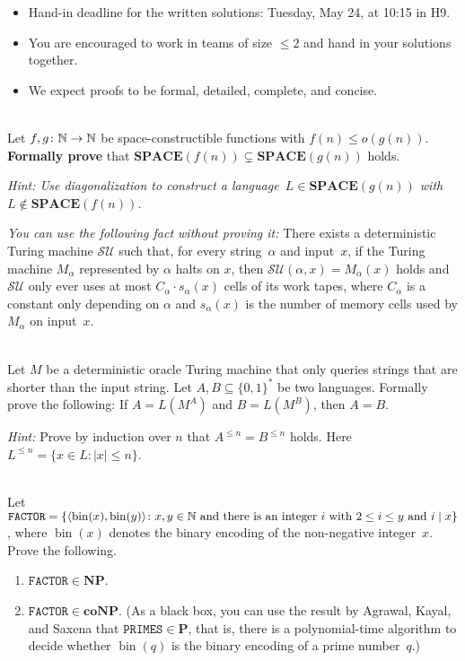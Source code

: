\documentclass[english]{uebung_cs}
\begin{document}
\begin{itemize}
  \item Hand-in deadline for the written solutions: Tuesday, May 24, at 10:15 in H9.
  \item You are encouraged to work in teams of size $\le 2$ and hand in your solutions together.
  \item We expect proofs to be formal, detailed, complete, and concise.
\end{itemize}

\begin{aufgabe}[Diagonalization]\mbox{}\\
    Let $f,g\colon\mathbb{N}\to\mathbb{N}$ be space-constructible functions with $f(n)\le o(g(n))$.
    \textbf{Formally prove} that $\mathbf{SPACE}(f(n))\subsetneq\mathbf{SPACE}(g(n))$ holds.

    \textit{Hint: Use diagonalization to construct a language~$L\in\mathbf{SPACE}(g(n))$ with $L\not\in\mathbf{SPACE}(f(n))$.}

    \textit{You can use the following fact without proving it:}
    There exists a deterministic Turing machine $\mathcal{SU}$ such that, for every string~$\alpha$ and input~$x$, if the Turing machine $M_\alpha$ represented by $\alpha$ halts on $x$, then
      $\mathcal{SU}(\alpha,x)=M_\alpha(x)$ holds and
      $\mathcal{SU}$ only ever uses at most $C_\alpha\cdot s_\alpha(x)$ cells of its work tapes, where $C_\alpha$ is a constant only depending on $\alpha$ and $s_\alpha(x)$ is the number of memory cells used by $M_\alpha$ on input~$x$.
\end{aufgabe}

\begin{aufgabe}[Oracles]\mbox{}\\
  Let $M$ be a deterministic oracle Turing machine that only queries strings 
  that are shorter than the input string.
  Let $A,B\subseteq\{0,1\}^\ast$ be two languages.
  Formally prove the following: If $A = L(M^A)$ and $B = L(M^B)$, then $A = B$.
  
  \emph{Hint:} Prove by induction over $n$ that $A^{\le n} = B^{\le n}$ holds. Here $L^{\le n}=\{x\in L\colon |x|\le n\}$.
\end{aufgabe}

\begin{aufgabe}\mbox{}\\
  Let $\mathtt{FACTOR}=\{\langle\operatorname{bin}(x),\operatorname{bin}(y)\rangle\colon \text{$x,y\in\mathbb{N}$ and there is an integer $i$ with $2\le i \le y$ and $i \mathrel{|} x$}\}$,
  where $\operatorname{bin}(x)$ denotes the binary encoding of the non-negative integer~$x$.
  Prove the following.
  \begin{enumerate}
    \item $\mathtt{FACTOR}\in\mathbf{NP}$.
    \item $\mathtt{FACTOR}\in\mathbf{coNP}$. (As a black box, you can use the result by Agrawal, Kayal, and Saxena that $\mathtt{PRIMES}\in\mathbf{P}$, that is, there is a polynomial-time algorithm to decide whether $\operatorname{bin}(q)$ is the binary encoding of a prime number~$q$.)
  \end{enumerate}
\end{aufgabe}
\end{document}

